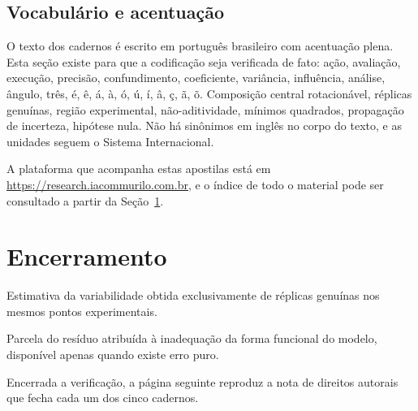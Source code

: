 \subsection{Vocabulário e acentuação}

O texto dos cadernos é escrito em português brasileiro com acentuação plena.
Esta seção existe para que a codificação seja verificada de fato:
ação, avaliação, execução, precisão, confundimento, coeficiente, variância,
influência, análise, ângulo, três, é, ê, á, à, ó, ú, í, â, ç, ã, õ.
Composição central rotacionável, réplicas genuínas, região experimental,
não-aditividade, mínimos quadrados, propagação de incerteza, hipótese nula.
Não há sinônimos em inglês no corpo do texto, e as unidades seguem o Sistema
Internacional.

A plataforma que acompanha estas apostilas está em
\url{https://research.iacommurilo.com.br}, e o índice de todo o material pode
ser consultado a partir da Seção~\ref{sec:encerramento}.

\section{Encerramento}
\label{sec:encerramento}

\begin{description}[style=nextline, leftmargin=1.4em, itemsep=3pt, topsep=4pt]
  \item[Erro puro] Estimativa da variabilidade obtida exclusivamente de
    réplicas genuínas nos mesmos pontos experimentais.
  \item[Falta de ajuste] Parcela do resíduo atribuída à inadequação da forma
    funcional do modelo, disponível apenas quando existe erro puro.
\end{description}

Encerrada a verificação, a página seguinte reproduz a nota de direitos
autorais que fecha cada um dos cinco cadernos.

\paginadireitos


